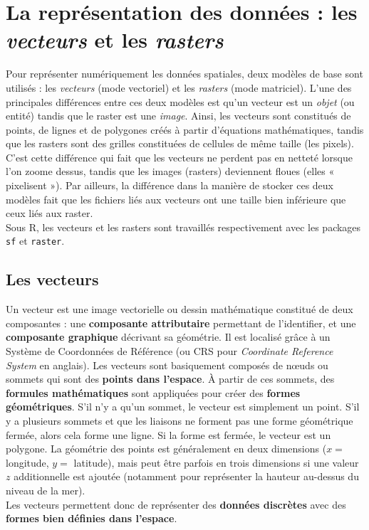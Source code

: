 \documentclass[
  french,
]{book}
\begin{document}
\hypertarget{data-sig}{%
\section{\texorpdfstring{La représentation des données : les \emph{vecteurs} et les \emph{rasters}}{La représentation des données : les vecteurs et les rasters}}\label{data-sig}}

Pour représenter numériquement les données spatiales, deux modèles de base sont
utilisés : les \emph{vecteurs} (mode vectoriel) et les \emph{rasters} (mode matriciel).
L'une des principales différences entre ces deux modèles est qu'un vecteur est
un \emph{objet} (ou entité) tandis que le raster est une \emph{image}. Ainsi, les vecteurs
sont constitués de points, de lignes et de polygones créés à partir d'équations
mathématiques, tandis que les rasters sont des grilles constituées de cellules
de même taille (les pixels). C'est cette différence qui fait que les vecteurs ne
perdent pas en netteté lorsque l'on zoome dessus, tandis que les images
(rasters) deviennent floues (elles « pixelisent »). Par ailleurs, la différence
dans la manière de stocker ces deux modèles fait que les fichiers liés aux
vecteurs ont une taille bien inférieure que ceux liés aux raster.\\
Sous R, les vecteurs et les rasters sont travaillés respectivement avec les
packages \texttt{sf} et \texttt{raster}.

\hypertarget{vectors}{%
\subsection{Les vecteurs}\label{vectors}}

Un vecteur est une image vectorielle ou dessin mathématique constitué de deux
composantes : une \textbf{composante attributaire} permettant de l'identifier, et une
\textbf{composante graphique} décrivant sa géométrie. Il est localisé grâce à un
Système de Coordonnées de Référence (ou CRS pour \emph{Coordinate Reference System}
en anglais). Les vecteurs sont basiquement composés de nœuds ou sommets qui sont
des \textbf{points dans l'espace}. À partir de ces sommets, des \textbf{formules
mathématiques} sont appliquées pour créer des \textbf{formes géométriques}. S'il n'y
a qu'un sommet, le vecteur est simplement un point. S'il y a plusieurs sommets
et que les liaisons ne forment pas une forme géométrique fermée, alors cela
forme une ligne. Si la forme est fermée, le vecteur est un polygone. La
géométrie des points est généralement en deux dimensions (\(x =\) longitude, \(y =\)
latitude), mais peut être parfois en trois dimensions si une valeur \(z\)
additionnelle est ajoutée (notamment pour représenter la hauteur au-dessus du
niveau de la mer).\\
Les vecteurs permettent donc de représenter des \textbf{données discrètes} avec des
\textbf{formes bien définies dans l'espace}.
\end{document}
